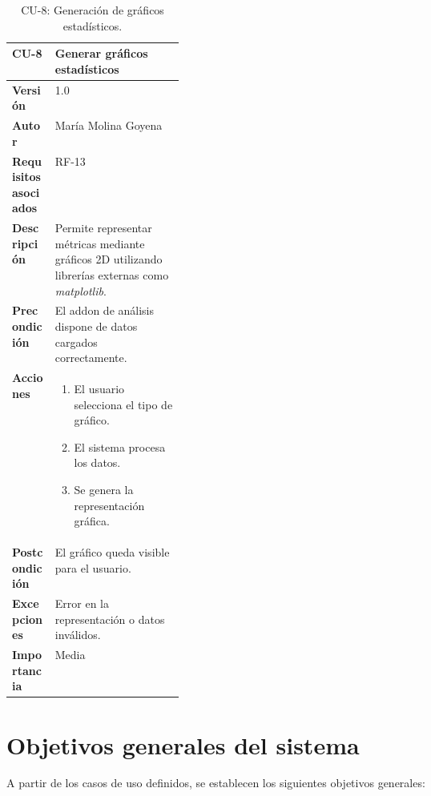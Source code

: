 \begin{table}[p]
\centering
\begin{tabularx}{\linewidth}{p{0.25\linewidth} X}
\toprule
\textbf{CU-8} & Generar gráficos estadísticos \\
\midrule
\textbf{Versión} & 1.0 \\
\textbf{Autor} & María Molina Goyena \\
\textbf{Requisitos asociados} & RF-13 \\
\textbf{Descripción} & Permite representar métricas mediante gráficos 2D utilizando librerías externas como \textit{matplotlib}. \\
\textbf{Precondición} & El addon de análisis dispone de datos cargados correctamente. \\
\textbf{Acciones} &
\begin{minipage}[t]{\linewidth}
\begin{enumerate}
    \item El usuario selecciona el tipo de gráfico.
    \item El sistema procesa los datos.
    \item Se genera la representación gráfica.
\end{enumerate}
\end{minipage} \\
\textbf{Postcondición} & El gráfico queda visible para el usuario. \\
\textbf{Excepciones} & Error en la representación o datos inválidos. \\
\textbf{Importancia} & Media \\
\bottomrule
\end{tabularx}
\caption{CU-8: Generación de gráficos estadísticos.}
\label{tab:cu8}
\end{table}

\clearpage

\section{Objetivos generales del sistema}

A partir de los casos de uso definidos, se establecen los siguientes objetivos generales:

